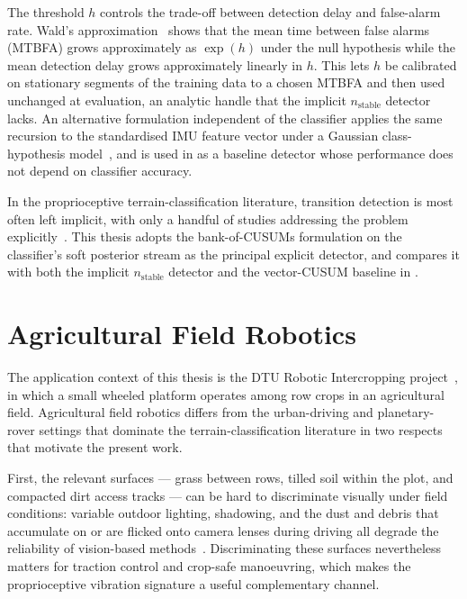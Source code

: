 The threshold $h$ controls the trade-off between detection delay and false-alarm rate. Wald's approximation~\cite[Eq.~6.74]{Blanke2003} shows that the mean time between false alarms (MTBFA) grows approximately as $\exp(h)$ under the null hypothesis while the mean detection delay grows approximately linearly in $h$. This lets $h$ be calibrated on stationary segments of the training data to a chosen MTBFA and then used unchanged at evaluation, an analytic handle that the implicit $n_{\text{stable}}$ detector lacks. An alternative formulation independent of the classifier applies the same recursion to the standardised IMU feature vector under a Gaussian class-hypothesis model~\cite[\S6.4.3]{Blanke2003}, and is used in  as a baseline detector whose performance does not depend on classifier accuracy.

In the proprioceptive terrain-classification literature, transition detection is most often left implicit, with only a handful of studies addressing the problem explicitly~\cite{Bai2019}. This thesis adopts the bank-of-CUSUMs formulation on the classifier's soft posterior stream as the principal explicit detector, and compares it with both the implicit $n_{\text{stable}}$ detector and the vector-CUSUM baseline in .


\section{Agricultural Field Robotics}
\label{sec:bg-agri}

The application context of this thesis is the DTU Robotic Intercropping project~\cite{RoboticIntercroppingDTU2026,RoboticIntercroppingProject2026}, in which a small wheeled platform operates among row crops in an agricultural field. Agricultural field robotics differs from the urban-driving and planetary-rover settings that dominate the terrain-classification literature in two respects that motivate the present work.

First, the relevant surfaces --- grass between rows, tilled soil within the plot, and compacted dirt access tracks --- can be hard to discriminate visually under field conditions: variable outdoor lighting, shadowing, and the dust and debris that accumulate on or are flicked onto camera lenses during driving all degrade the reliability of vision-based methods~\cite{Reina2016}. Discriminating these surfaces nevertheless matters for traction control and crop-safe manoeuvring, which makes the proprioceptive vibration signature a useful complementary channel.


